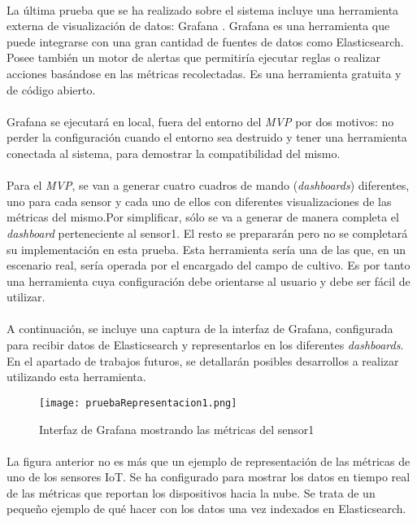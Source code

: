 \documentclass[../../memoria.tex]{subfiles}
\begin{document}
\paragraph{}
La última prueba que se ha realizado sobre el sistema incluye una herramienta externa de visualización de datos: Grafana \cite{grafana}. Grafana es una herramienta que puede integrarse con una gran cantidad de fuentes de datos como Elasticsearch. Posee también un motor de alertas que permitiría ejecutar reglas o realizar acciones basándose en las métricas recolectadas. Es una herramienta gratuita y de código abierto.

\paragraph{}
Grafana se ejecutará en local, fuera del entorno del \textit{MVP} por dos motivos: no perder la configuración cuando el entorno sea destruido y tener una herramienta conectada al sistema, para demostrar la compatibilidad del mismo.

\paragraph{}
Para el \textit{MVP}, se van a generar cuatro cuadros de mando (\textit{dashboards}) diferentes, uno para cada sensor y cada uno de ellos con diferentes visualizaciones de las métricas del mismo.Por simplificar, sólo se va a generar de manera completa el \textit{dashboard} perteneciente al sensor1. El resto se prepararán pero no se completará su implementación en esta prueba. Esta herramienta sería una de las que, en un escenario real, sería operada por el encargado del campo de cultivo. Es por tanto una herramienta cuya configuración debe orientarse al usuario y debe ser fácil de utilizar.

\paragraph{}
A continuación, se incluye una captura de la interfaz de Grafana, configurada para recibir datos de Elasticsearch y representarlos en los diferentes \textit{dashboards}. En el apartado de trabajos futuros, se detallarán posibles desarrollos a realizar utilizando esta herramienta.

\begin{figure}[H]
    \centering
    \texttt{[image: pruebaRepresentacion1.png]}
    \caption{Interfaz de Grafana mostrando las métricas del sensor1}
    \label{fig:pruebaRepresentacion1}
\end{figure}

\paragraph{}
La figura anterior no es más que un ejemplo de representación de las métricas de uno de los sensores IoT. Se ha configurado para mostrar los datos en tiempo real de las métricas que reportan los dispositivos hacia la nube. Se trata de un pequeño ejemplo de qué hacer con los datos una vez indexados en Elasticsearch.
\end{document}

